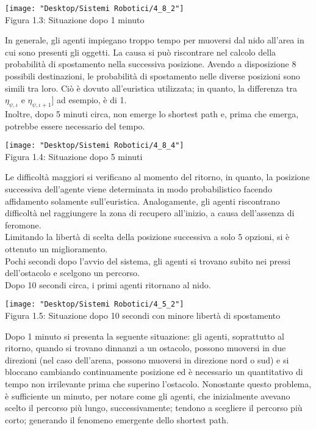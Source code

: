 \documentclass[12pt,a4paper,openright,twoside]{report}
\begin{document}
\begin{center}  
	\texttt{[image: "Desktop/Sistemi Robotici/4\_8\_2"]}
	\\Figura 1.3: Situazione dopo 1 minuto
\end{center}

In generale, gli agenti impiegano troppo tempo per muoversi dal nido all'area in cui sono presenti gli oggetti. La causa si può riscontrare nel calcolo della probabilità di spostamento nella successiva posizione. Avendo a disposizione 8 possibili destinazioni, le probabilità di spostamento nelle diverse posizioni sono simili tra loro. Ciò è dovuto all'euristica utilizzata; in quanto, la differenza tra $\eta_{\psi,\iota}$ e $\eta_{\psi,\iota+1}]$ ad esempio, è di 1.\\
Inoltre, dopo 5 minuti circa, non emerge lo shortest path e, prima che emerga, potrebbe essere necessario del tempo.

\begin{center}  
	\texttt{[image: "Desktop/Sistemi Robotici/4\_8\_4"]}
	\\Figura 1.4: Situazione dopo 5 minuti
\end{center}

Le difficoltà maggiori si verificano al momento del ritorno, in quanto, la posizione successiva dell'agente viene determinata in modo probabilistico facendo affidamento solamente sull'euristica. Analogamente, gli agenti riscontrano difficoltà nel raggiungere la zona di recupero all'inizio, a causa dell'assenza di feromone.\\
Limitando la libertà di scelta della posizione successiva a solo 5 opzioni, si è ottenuto un miglioramento.\\
Pochi secondi dopo l'avvio del sistema, gli agenti si trovano subito nei pressi dell'ostacolo e scelgono un percorso.\\
Dopo 10 secondi circa, i primi agenti ritornano al nido.\\

\begin{center}  
	\texttt{[image: "Desktop/Sistemi Robotici/4\_5\_2"]}
	\\Figura 1.5: Situazione dopo 10 secondi con minore libertà di spostamento
\end{center}

Dopo 1 minuto si presenta la seguente situazione: gli agenti, soprattutto al ritorno, quando si trovano dinnanzi a un ostacolo, possono muoversi in due direzioni (nel caso dell'arena, possono muoversi in direzione nord o sud) e si bloccano cambiando continuamente posizione ed è necessario un quantitativo di tempo non irrilevante prima che superino l'ostacolo. Nonostante questo problema, è sufficiente un minuto, per notare come gli agenti, che inizialmente avevano scelto il percorso più lungo, successivamente; tendono a scegliere il percorso più corto; generando il fenomeno emergente dello shortest path.
\end{document}
